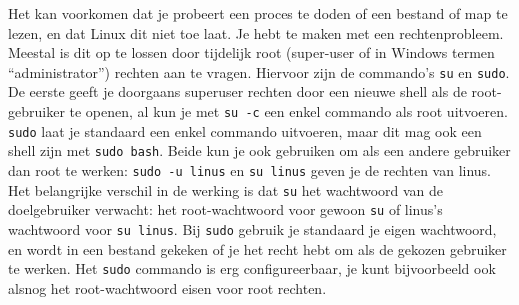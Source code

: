 Het kan voorkomen dat je probeert een proces te doden of een bestand of map te lezen, en dat Linux dit niet toe laat. Je hebt te maken met een rechtenprobleem. Meestal is dit op te lossen door tijdelijk root (super-user of in Windows termen ``administrator'') rechten aan te vragen. Hiervoor zijn de commando's \texttt{su} en \texttt{sudo}. De eerste geeft je doorgaans superuser rechten door een nieuwe shell als de root-gebruiker te openen, al kun je met \texttt{su\ -c} een enkel commando als root uitvoeren. \texttt{sudo} laat je standaard een enkel commando uitvoeren, maar dit mag ook een shell zijn met \texttt{sudo\ bash}. Beide kun je ook gebruiken om als een andere gebruiker dan root te werken: \texttt{sudo\ -u\ linus} en \texttt{su\ linus} geven je de rechten van linus. Het belangrijke verschil in de werking is dat \texttt{su} het wachtwoord van de doelgebruiker verwacht: het root-wachtwoord voor gewoon \texttt{su} of linus's wachtwoord voor \texttt{su\ linus}. Bij \texttt{sudo} gebruik je standaard je eigen wachtwoord, en wordt in een bestand gekeken of je het recht hebt om als de gekozen gebruiker te werken. Het \texttt{sudo} commando is erg configureerbaar, je kunt bijvoorbeeld ook alsnog het root-wachtwoord eisen voor root rechten.


